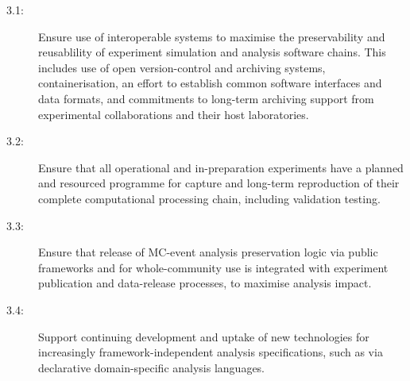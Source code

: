 \documentclass[11pt]{article}
\begin{document}

\begin{description}
   \item[3.1:] Ensure use of interoperable systems to maximise the preservability and reusablility of experiment simulation and analysis software chains. This includes use of open version-control and archiving systems, containerisation, an effort to establish common software interfaces and data formats, and commitments to long-term archiving support from experimental collaborations and their host laboratories.
   
   \item[3.2:] Ensure that all operational and in-preparation experiments have a planned and resourced programme for capture and long-term reproduction of their complete computational processing chain, including validation testing.
   
   \item[3.3:] Ensure that release of MC-event analysis preservation logic via public frameworks and for whole-community use is integrated with experiment publication and data-release processes, to maximise analysis impact.
   \item[3.4:] Support continuing development and uptake of new technologies for increasingly framework-independent analysis specifications, such as via declarative domain-specific analysis languages.
   

\end{description}
\end{document}
